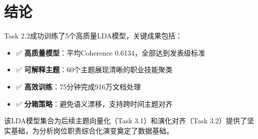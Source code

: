 \documentclass[11pt,a4paper]{article}
\begin{document}
\section{结论}

Task 2.2成功训练了5个高质量LDA模型，关键成果包括：

\begin{itemize}
    \item ✅ \textbf{高质量模型}：平均Coherence 0.6134，全部达到发表级标准
    \item ✅ \textbf{可解释主题}：60个主题展现清晰的职业技能聚类
    \item ✅ \textbf{高效训练}：75分钟完成916万文档处理
    \item ✅ \textbf{分箱策略}：避免语义漂移，支持跨时间主题对齐
\end{itemize}

该LDA模型集合为后续主题向量化（Task 3.1）和演化对齐（Task 3.2）提供了坚实基础，为分析岗位职责综合化演变奠定了数据基础。
\end{document}

